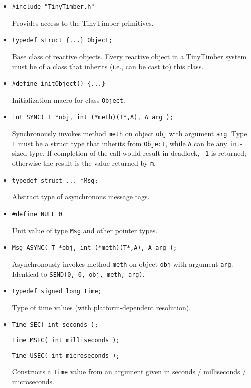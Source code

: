 \documentclass[12pt]{article}
\begin{document}
\begin{itemize}

\item {\tt \#include "TinyTimber.h"}

Provides access to the TinyTimber primitives.

\item {\tt typedef struct \{...\} Object;}

Base class of reactive objects.  Every reactive object in a TinyTimber system must be of a class that inherits (i.e., can be cast to) this class.

\item {\tt \#define initObject() \{...\}}

Initialization macro for class {\tt Object}.

\item {\tt int SYNC( T *obj, int (*meth)(T*,A), A arg );}

Synchronously invokes method {\tt meth} on object {\tt obj} with argument {\tt arg}.  Type {\tt T} must be a struct type that inherits from {\tt Object}, while {\tt A} can be any {\tt int}-sized type.  If completion of the call would result in deadlock, {\tt -1} is returned; otherwise the result is the value returned by {\tt m}.

\item {\tt typedef struct ... *Msg;}

Abstract type of asynchronous message tags.

\item {\tt \#define NULL  0}

Unit value of type {\tt Msg} and other pointer types.

\item {\tt Msg ASYNC( T *obj, int (*meth)(T*,A), A arg );}

Asynchronously invokes method {\tt meth} on object {\tt obj} with argument {\tt arg}.  Identical to {\tt SEND(0, 0, obj, meth, arg)}.

\item {\tt typedef signed long Time;}

Type of time values (with platform-dependent resolution).

\item {\tt Time SEC( int seconds );}

      {\tt Time MSEC( int milliseconds );}

      {\tt Time USEC( int microseconds );}

Constructs a {\tt Time} value from an argument given in seconds / milliseconds / microseconds.


\end{itemize}
\end{document}

